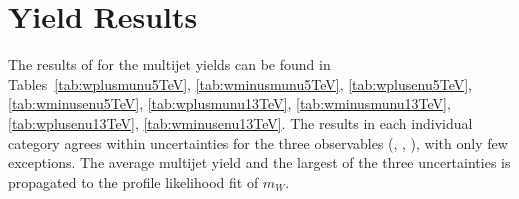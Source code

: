 \section{Yield Results}
\label{sec:mj_results}

The results of for the multijet yields can be found in Tables~\ref{tab:wplusmunu5TeV}, \ref{tab:wminusmunu5TeV}, \ref{tab:wplusenu5TeV}, \ref{tab:wminusenu5TeV}, \ref{tab:wplusmunu13TeV}, \ref{tab:wminusmunu13TeV}, \ref{tab:wplusenu13TeV}, \ref{tab:wminusenu13TeV}.
The results in each individual category agrees within uncertainties for the three observables (\ptl, \mt, \met), with only few exceptions.
The average multijet yield and the largest of the three uncertainties is propagated to the profile likelihood fit of $m_W$.











